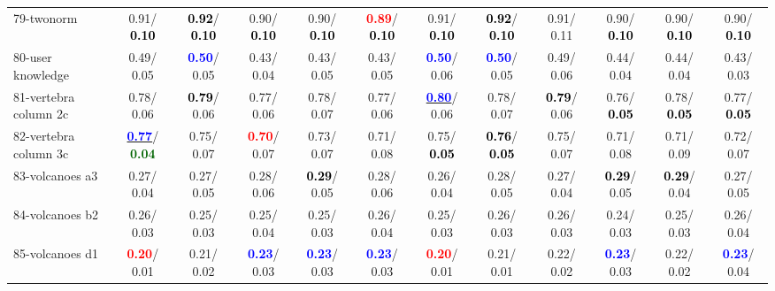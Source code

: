 \begin{table}[h]
\begin{center}
{\begin{tabular}{lc|c|c|c|c|c|c|c|c|c|c}
79-twonorm &   0.91/\textcolor{black}{\textbf{  0.10}} & \textcolor{black}{\textbf{  0.92}}/\textcolor{black}{\textbf{  0.10}} &   0.90/\textcolor{black}{\textbf{  0.10}} &   0.90/\textcolor{black}{\textbf{  0.10}} & \textcolor{red}{\textbf{  0.89}}/\textcolor{black}{\textbf{  0.10}} &   0.91/\textcolor{black}{\textbf{  0.10}} & \textcolor{black}{\textbf{  0.92}}/\textcolor{black}{\textbf{  0.10}} &   0.91/  0.11 &   0.90/\textcolor{black}{\textbf{  0.10}} &   0.90/\textcolor{black}{\textbf{  0.10}} &   0.90/\textcolor{black}{\textbf{  0.10}} \\
80-user knowledge &   0.49/  0.05 & \textcolor{blue}{\textbf{  0.50}}/  0.05 &   0.43/  0.04 &   0.43/  0.05 &   0.43/  0.05 & \textcolor{blue}{\textbf{  0.50}}/  0.06 & \textcolor{blue}{\textbf{  0.50}}/  0.05 &   0.49/  0.06 &   0.44/  0.04 &   0.44/  0.04 &   0.43/  0.03 \\
81-vertebra column 2c &   0.78/  0.06 & \textcolor{black}{\textbf{  0.79}}/  0.06 &   0.77/  0.06 &   0.78/  0.07 &   0.77/  0.06 & \underline{\textcolor{blue}{\textbf{  0.80}}}/  0.06 &   0.78/  0.07 & \textcolor{black}{\textbf{  0.79}}/  0.06 &   0.76/\textcolor{black}{\textbf{  0.05}} &   0.78/\textcolor{black}{\textbf{  0.05}} &   0.77/\textcolor{black}{\textbf{  0.05}} \\
82-vertebra column 3c & \underline{\textcolor{blue}{\textbf{  0.77}}}/\textcolor{darkgreen}{\textbf{  0.04}} &   0.75/  0.07 & \textcolor{red}{\textbf{  0.70}}/  0.07 &   0.73/  0.07 &   0.71/  0.08 &   0.75/\textcolor{black}{\textbf{  0.05}} & \textcolor{black}{\textbf{  0.76}}/\textcolor{black}{\textbf{  0.05}} &   0.75/  0.07 &   0.71/  0.08 &   0.71/  0.09 &   0.72/  0.07 \\
83-volcanoes a3 &   0.27/  0.04 &   0.27/  0.05 &   0.28/  0.06 & \textcolor{black}{\textbf{  0.29}}/  0.05 &   0.28/  0.06 &   0.26/  0.04 &   0.28/  0.05 &   0.27/  0.04 & \textcolor{black}{\textbf{  0.29}}/  0.05 & \textcolor{black}{\textbf{  0.29}}/  0.04 &   0.27/  0.05 \\
84-volcanoes b2 &   0.26/  0.03 &   0.25/  0.03 &   0.25/  0.04 &   0.25/  0.03 &   0.26/  0.04 &   0.25/  0.03 &   0.26/  0.03 &   0.26/  0.03 &   0.24/  0.03 &   0.25/  0.03 &   0.26/  0.04 \\
85-volcanoes d1 & \textcolor{red}{\textbf{  0.20}}/  0.01 &   0.21/  0.02 & \textcolor{blue}{\textbf{  0.23}}/  0.03 & \textcolor{blue}{\textbf{  0.23}}/  0.03 & \textcolor{blue}{\textbf{  0.23}}/  0.03 & \textcolor{red}{\textbf{  0.20}}/  0.01 &   0.21/  0.01 &   0.22/  0.02 & \textcolor{blue}{\textbf{  0.23}}/  0.03 &   0.22/  0.02 & \textcolor{blue}{\textbf{  0.23}}/  0.04 \\ \hline

\end{tabular}}
\end{center}
\end{table}
